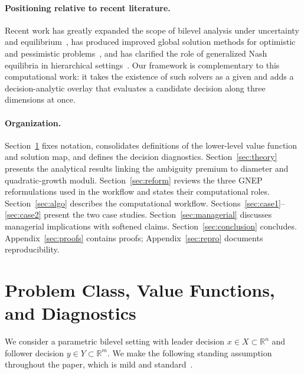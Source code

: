 \documentclass[11pt]{article}
\theoremstyle{definition}
\newcommand{\R}{\mathbb{R}}
\begin{document}
\paragraph{Positioning relative to recent literature.}
Recent work has greatly expanded the scope of bilevel analysis
under uncertainty and
equilibrium~\cite{beck2023survey,besanccon2019near,
buchheim2022stochastic,burtscheidt2020risk}, has produced improved
global solution methods for optimistic and pessimistic
problems~\cite{kleniati2015generalization,djelassi2021recent,liu2018pessimistic,
mitsos2008global,tsoukalas2009global}, and has clarified the role of
generalized Nash equilibria in hierarchical
settings~\cite{facchinei2007generalized,dreves2011solution,
kulkarni2012variational}. Our framework is complementary to this
computational work: it takes the existence of such solvers as a
given and adds a decision-analytic overlay that evaluates a
candidate decision along three dimensions at once.

\paragraph{Organization.} Section~\ref{sec:problem} fixes notation,
consolidates definitions of the lower-level value function and
solution map, and defines the decision diagnostics.
Section~\ref{sec:theory} presents the analytical results linking
the ambiguity premium to diameter and quadratic-growth moduli.
Section~\ref{sec:reform} reviews the three GNEP reformulations
used in the workflow and states their computational roles.
Section~\ref{sec:algo} describes the computational workflow.
Sections~\ref{sec:case1}--\ref{sec:case2} present the two case
studies. Section~\ref{sec:managerial} discusses managerial
implications with softened claims.
Section~\ref{sec:conclusion} concludes. Appendix~\ref{sec:proofs}
contains proofs; Appendix~\ref{sec:repro} documents
reproducibility.

\section{Problem Class, Value Functions, and Diagnostics}
\label{sec:problem}
We consider a parametric bilevel setting with leader decision
$x\in X\subset\R^n$ and follower decision $y\in Y\subset\R^m$. We
make the following standing assumption throughout the paper, which
is mild and standard~\cite{bonnans2013perturbation,zemkohoo2020bilevel}.
\end{document}
